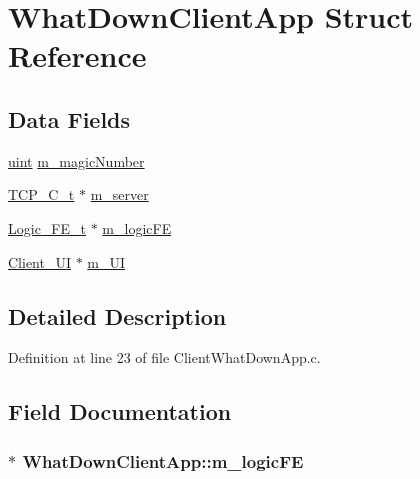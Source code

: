 \hypertarget{structWhatDownClientApp}{}\section{What\+Down\+Client\+App Struct Reference}
\label{structWhatDownClientApp}
\subsection*{Data Fields}
\begin{DoxyCompactItemize}
\item 
\hyperlink{tcp_8h_a91ad9478d81a7aaf2593e8d9c3d06a14}{uint} \hyperlink{structWhatDownClientApp_af2a582f2bc2f3b90adf7dee77397d583}{m\+\_\+magic\+Number}
\item 
\hyperlink{tcp__client_8h_a3db7b57ed8c85377051fea41ecaf4ff9}{T\+C\+P\+\_\+\+C\+\_\+t} $\ast$ \hyperlink{structWhatDownClientApp_acfe7a509130c7a3d12c3eeaa24639e14}{m\+\_\+server}
\item 
\hyperlink{Client__ui_8h_adc22b842bed5c7e594f04d5f5a110b2c}{Logic\+\_\+\+F\+E\+\_\+t} $\ast$ \hyperlink{structWhatDownClientApp_a090c27b5218720dd7d5dfdc42604e7f8}{m\+\_\+logic\+FE}
\item 
\hyperlink{structClient__UI}{Client\+\_\+\+UI} $\ast$ \hyperlink{structWhatDownClientApp_a8672f274e231d00df2a5e4cb1c5f43a1}{m\+\_\+\+UI}
\end{DoxyCompactItemize}


\subsection{Detailed Description}


Definition at line 23 of file Client\+What\+Down\+App.\+c.



\subsection{Field Documentation}
\subsubsection[{\texorpdfstring{m\+\_\+logic\+FE}{m_logicFE}}]{$\ast$ What\+Down\+Client\+App\+::m\+\_\+logic\+FE}\hypertarget{structWhatDownClientApp_a090c27b5218720dd7d5dfdc42604e7f8}{}\label{structWhatDownClientApp_a090c27b5218720dd7d5dfdc42604e7f8}


